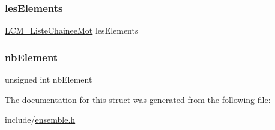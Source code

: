 \subsubsection{\texorpdfstring{les\+Elements}{lesElements}}
{\footnotesize\ttfamily \hyperlink{liste_chainee_mot_8h_ad50c59d1ac1fa184aba663121d8e4087}{L\+C\+M\+\_\+\+Liste\+Chainee\+Mot} les\+Elements}

\mbox{\label{struct_e___ensemble_a09f469f9924ee9a8290da83c6f7b76a0}} 
\subsubsection{\texorpdfstring{nb\+Element}{nbElement}}
{\footnotesize\ttfamily unsigned int nb\+Element}



The documentation for this struct was generated from the following file\+:\begin{DoxyCompactItemize}
\item 
include/\hyperlink{ensemble_8h}{ensemble.\+h}\end{DoxyCompactItemize}
